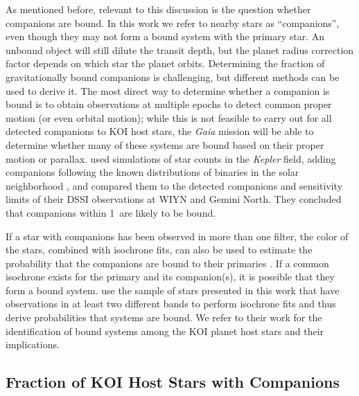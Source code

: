 \documentclass[twocolumn,appendixfloats]{aastex6}
\begin{document}
As mentioned before, relevant to this discussion is the question whether 
companions are bound. In this work we refer to nearby stars as 
``companions'', even though they may not form a bound system with the 
primary star. An unbound object will still dilute the transit depth, but the 
planet radius correction factor depends on which star the planet orbits.
Determining the fraction of gravitationally bound companions is challenging,
but different methods can be used to derive it. The most direct way to determine
whether a companion is bound is to obtain observations at multiple epochs to 
detect common proper motion (or even orbital motion); while this is not
feasible to carry out for all detected companions to KOI host stars, the {\it Gaia}
mission \citep{prusti16} will be able to determine whether many of these 
systems are bound based on their proper motion or parallax. 
\citet{horch14} used simulations of star counts in the {\it Kepler} field, adding
companions following the known distributions of binaries in the solar
neighborhood \citep{duquennoy91, raghavan10}, and compared them to
the detected companions and sensitivity limits of their DSSI observations 
at WIYN and Gemini North. They concluded that companions within 
1\arcsec\ are likely to be bound.

If a star with companions has been observed in more than one filter,
the color of the stars, combined with isochrone fits, can also be used to 
estimate the probability that the companions are bound to their primaries 
\citep[e.g.,][] {lillo-box12, everett15, teske15}. If a common isochrone exists for the 
primary and its companion(s), it is possible that they form a bound system. 
\citet{hirsch16} use the sample of stars presented in this work that have 
observations in at least two different bands to perform isochrone fits 
and thus derive probabilities that systems are bound. We refer to their 
work for the identification of bound systems among the KOI planet host 
stars and their implications.
 

\subsection{Fraction of KOI Host Stars with Companions}
\end{document}
